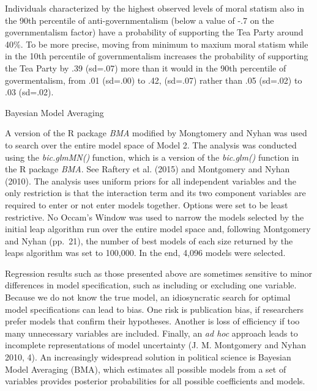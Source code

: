 \documentclass[12pt,]{article}
\begin{document}
Individuals characterized by the highest observed levels of moral
statism also in the 90th percentile of anti-governmentalism (below a
value of -.7 on the governmentalism factor) have a probability of
supporting the Tea Party around 40\%. To be more precise, moving from
minimum to maxium moral statism while in the 10th percentile of
governmentalism increases the probability of supporting the Tea Party by
.39 (sd=.07) more than it would in the 90th percentile of
govermentalism, from .01 (sd=.00) to .42, (sd=.07) rather than .05
(sd=.02) to .03 (sd=.02).

\clearpage

Bayesian Model Averaging

A version of the R package \emph{BMA} modified by
Mongtomery and Nyhan was used to search over the entire model space of
Model 2. The analysis was conducted using the \emph{bic.glmMN()} function, which is a version of the
\emph{bic.glm()} function in the R package \emph{BMA}. See Raftery et
  al. (2015) and Montgomery and Nyhan (2010). The analysis uses
uniform priors for all independent variables and the only restriction is
that the interaction term and its two component variables are required
to enter or not enter models together. Options were set to be least restrictive.
No Occam's Window was used to narrow the models selected by the initial leap algorithm run over the entire model space and, following Montgomery and Nyhan (pp.~21), the number of best models of each size returned by the leaps algorithm was set to 100,000. In the end, 4,096 models were selected.

Regression results such as those presented above are sometimes sensitive
to minor differences in model specification, such as including or
excluding one variable. Because we do not know the true model, an
idiosyncratic search for optimal model specifications can lead to bias.
One risk is publication bias, if researchers prefer models that confirm
their hypotheses. Another is loss of efficiency if too many unnecessary
variables are included. Finally, an \emph{ad hoc} approach leads to
incomplete representations of model uncertainty (J. M. Montgomery and
Nyhan 2010, 4). An increasingly widespread solution in political science
is Bayesian Model Averaging (BMA), which estimates all possible models
from a set of variables provides posterior probabilities for all
possible coefficients and models.
\end{document}
